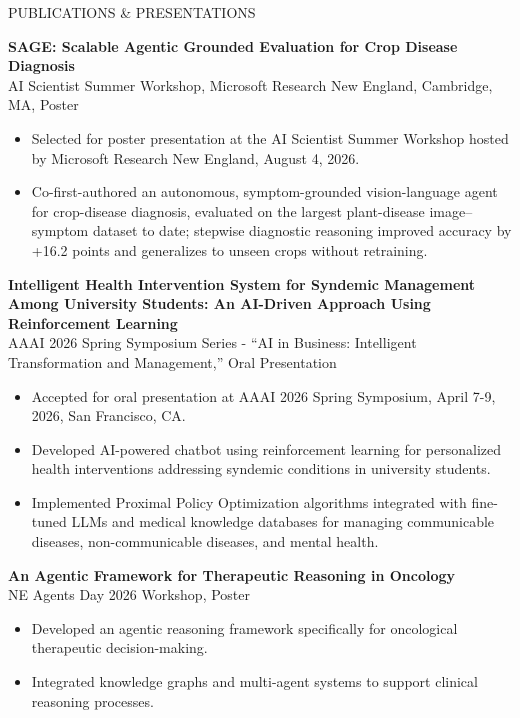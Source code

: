 \documentclass{resume} %
\begin{document}
\begin{rSection}{PUBLICATIONS \& PRESENTATIONS}

\textbf{SAGE: Scalable Agentic Grounded Evaluation for Crop Disease Diagnosis} \\
AI Scientist Summer Workshop, Microsoft Research New England, Cambridge, MA, Poster
\begin{itemize}
    \item Selected for poster presentation at the AI Scientist Summer Workshop hosted by Microsoft Research New England, August 4, 2026.
    \item Co-first-authored an autonomous, symptom-grounded vision-language agent for crop-disease diagnosis, evaluated on the largest plant-disease image--symptom dataset to date; stepwise diagnostic reasoning improved accuracy by +16.2 points and generalizes to unseen crops without retraining.
\end{itemize}

\textbf{Intelligent Health Intervention System for Syndemic Management Among University Students: An AI-Driven Approach Using Reinforcement Learning} \\
AAAI 2026 Spring Symposium Series - ``AI in Business: Intelligent Transformation and Management,'' Oral Presentation
\begin{itemize}
    \item Accepted for oral presentation at AAAI 2026 Spring Symposium, April 7-9, 2026, San Francisco, CA.
    \item Developed AI-powered chatbot using reinforcement learning for personalized health interventions addressing syndemic conditions in university students.
    \item Implemented Proximal Policy Optimization algorithms integrated with fine-tuned LLMs and medical knowledge databases for managing communicable diseases, non-communicable diseases, and mental health.
\end{itemize}

\textbf{An Agentic Framework for Therapeutic Reasoning in Oncology} \\
NE Agents Day 2026 Workshop, Poster
\begin{itemize}
    \item Developed an agentic reasoning framework specifically for oncological therapeutic decision-making.
    \item Integrated knowledge graphs and multi-agent systems to support clinical reasoning processes.
\end{itemize}


\end{rSection}
\end{document}
